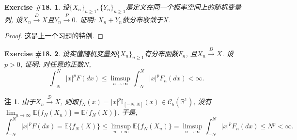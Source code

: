 \documentclass[UTF8, a4paper]{article}
\newtheorem{exercise}{Exercise \#18.}
\newtheorem*{remark}{注}
\begin{document}
\begin{framed}
\begin{exercise}
设\(\{X_n\}_{n\geq 1}, \{Y_n\}_{n\geq 1}\)是定义在同一个概率空间上的随机变量列, 
设\(X_n \xrightarrow{D}X\)且\(Y_n \xrightarrow{P} 0\). 证明: \(X_n + Y_n\)依分布收敛于\(X\).
\end{exercise}
\end{framed}

\begin{proof}
这是上一个习题的特例.
\end{proof}


\begin{framed}
\begin{exercise}
设实值随机变量列\(\{X_n\}_{n\geq 1}\)有分布函数\(F_n\), 且\(X_n \xrightarrow{D}X\).
设\(p>0\), 证明: 对任意的正数\(N\), 
$$
\int_{-N}^N|x|^p F(d x) \leq \limsup _{n \rightarrow \infty} \int_{-N}^N|x|^p F_n(d x)<\infty .
$$
\end{exercise}
\end{framed}

\begin{remark}
由于\(X_n \xrightarrow{\mathcal{D}} X\), 则取\(f_N(x) = |x|^p \mathbb{I}_{[-N,N]}(x) \in \mathscr{C}_b(\mathbb{R}^1)\), {\color{red}没}有{\color{red}\(\lim_{n\to\infty} \mathbb{E}\{f_N(X_n)\} = \mathbb{E}\{f_N(X)\}\)}. 于是, 
$$
\int_{-N}^N|x|^p F(d x) = \mathbb{E}\{f_N(X)\} \leq \limsup_{n\to\infty} \mathbb{E}\{f_N(X_n)\} = \limsup _{n \rightarrow \infty} \int_{-N}^N|x|^p F_n(d x) \leq N^p < \infty.
$$
\end{remark}
\end{document}

